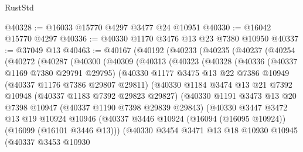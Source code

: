 \begin{lexlean}{RustStd}
\begin{coremodule}
@40328 := @16033 @15770 @4297 @3477 @24 @10951
@40330 := @16042 @15770 @4297
@40336 := @40330 @1170 @3476 @13 @23 @7380 @10950
@40337 := @37049 @13
@40463 := @40167
    (@40192
      (@40233
        (@40235
          (@40237
            (@40254
              (@40272
                (@40287
                  (@40300
                    (@40309
                      (@40313
                        (@40323
                          (@40328
                            (@40336
                              (@40337 @1169 @7380 @29791 @29795)
                              (@40330
                                @1177
                                @3475
                                @13
                                @22
                                @7386
                                @10949
                                (@40337 @1176 @7386 @29807 @29811)
                                (@40330
                                  @1184
                                  @3474
                                  @13
                                  @21
                                  @7392
                                  @10948
                                  (@40337 @1183 @7392 @29823 @29827)
                                  (@40330
                                    @1191
                                    @3473
                                    @13
                                    @20
                                    @7398
                                    @10947
                                    (@40337 @1190 @7398 @29839 @29843)
                                    (@40330
                                      @3447
                                      @3472
                                      @13
                                      @19
                                      @10924
                                      @10946
                                      (@40337
                                        @3446
                                        @10924
                                        (@16094 (@16095 @10924))
                                        (@16099 (@16101 @3446 @13)))
                                      (@40330
                                        @3454
                                        @3471
                                        @13
                                        @18
                                        @10930
                                        @10945
                                        (@40337
                                          @3453
                                          @10930

\end{coremodule}
\end{lexlean}
